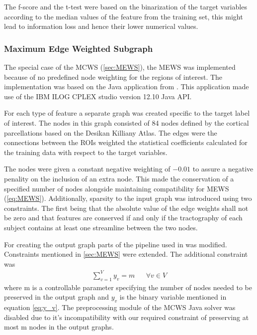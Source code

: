 \documentclass[msthesis.tex]{subfiles}
\begin{document}
The f-score and the t-test were based on the binarization of the target variables according to the median values of the feature from the training set, this might lead to information loss and hence their lower numerical values. 
\fi

\subsubsection{Maximum Edge Weighted Subgraph}
\label{method:MEWS}

The special case of the MCWS (\autoref{sec:MEWS}), the MEWS was implemented because of no predefined node weighting for the regions of interest. The implementation was based on  the Java application from \cite{DBLP:journals/corr/LobodaAS16}. This application made use of the IBM ILOG CPLEX studio version 12.10 Java API. 

For each type of feature a separate graph was created specific to the target label of interest. The nodes in this graph consisted of 84 nodes defined by the cortical parcellations based on the Desikan Killiany Atlas. The edges were the connections between the ROIs weighted the statistical coefficients calculated for the training data with respect to the target variables.

The nodes were given a constant negative weighting of $-0.01$ to assure a negative penality on the inclusion of an extra node. This made the conservation of a specified number of nodes alongside maintaining compatibility for MEWS (\autoref{eq:MEWS}). Additionally, sparsity to the input graph was introduced using two constraints. The first being that the absolute value of the edge weights shall not be zero and that features are conserved if and only if the tractography of each subject contains at least one streamline between the two nodes. 

For creating the output graph parts of the pipeline used in \cite{DBLP:journals/corr/LobodaAS16} was modified. Constraints mentioned in \autoref{sec:MEWS} were extended. The additional constraint was 
\begin{align}
    \label{eq:sum_constraints}
    \sum_{v=1}^{V} y_v = m        &&  \forall v \in V
\end{align}
where m is a controllable parameter specifying the number of nodes needed to be preserved in the output graph and $y_v$ is the binary variable mentioned in equation \autoref{eq:y_v}. The preprocessing module of the MCWS Java solver was disabled due to it's incompatibility with our required constraint of preserving at most m nodes in the output graphs.
\end{document}
